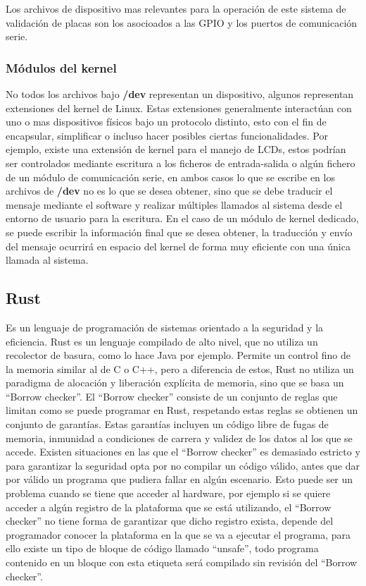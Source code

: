 \documentclass[12pt,letterpaper]{article}     %
\begin{document}
Los archivos de dispositivo mas relevantes para la operación de este sistema de validación de placas son los asocioados
a las GPIO y los puertos de comunicación serie.

\subsubsection{Módulos del kernel}

No todos los archivos bajo \textbf{/dev} representan un dispositivo, algunos representan extensiones del kernel de Linux.
Estas extensiones generalmente interactúan con uno o mas dispositivos físicos bajo un protocolo distinto, esto
con el fin de encapsular, simplificar o incluso hacer posibles ciertas funcionalidades. Por ejemplo,
existe una extensión de kernel para el manejo de LCDs, estos podrían ser controlados mediante escritura a los
ficheros de entrada-salida o algún fichero de un módulo de comunicación serie, en ambos casos lo que se 
escribe en los archivos de \textbf{/dev} no es lo que se desea obtener, sino que se debe traducir el mensaje mediante el
software y realizar múltiples llamados al sistema desde el entorno de usuario para la escritura. En el caso de un
módulo de kernel dedicado, se puede escribir la información final que se desea obtener, la traducción y envío del
mensaje ocurrirá en espacio del kernel de forma muy eficiente con una única llamada al sistema. 

\subsection{Rust}

Es un lenguaje de programación de sistemas orientado a la seguridad y la eficiencia. 
Rust es un lenguaje compilado de alto nivel, que no utiliza un recolector de basura, 
como lo hace Java por ejemplo. Permite un control fino de la memoria similar al de 
C o C++, pero a diferencia de estos, Rust no utiliza un paradigma de alocación y 
liberación explícita de memoria, sino que se basa un ``Borrow checker''.
El ``Borrow checker'' consiste de un conjunto de reglas que limitan como se puede 
programar en Rust, respetando estas reglas se obtienen un conjunto de garantías.
Estas garantías incluyen un código libre de fugas de memoria, inmunidad a condiciones 
de carrera y validez de los datos al los que se accede. 
Existen situaciones en las que el ``Borrow checker'' es demasiado estricto y para
garantizar la seguridad opta por no compilar un código válido, antes que dar por válido
un programa que pudiera fallar en algún escenario. Esto puede ser un problema cuando 
se tiene que acceder al hardware, por ejemplo si se quiere acceder a algún registro 
de la plataforma que se está utilizando, el ``Borrow checker'' no tiene forma de garantizar
que dicho registro exista, depende del programador conocer la plataforma en la que se va a 
ejecutar el programa, para ello existe un tipo de bloque de código llamado ``unsafe'', todo
programa contenido en un bloque con esta etiqueta será compilado sin revisión del ``Borrow checker''.
\end{document}
